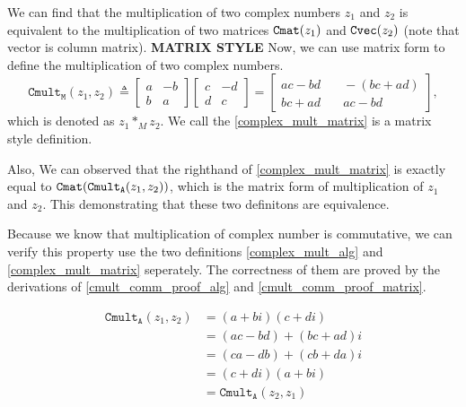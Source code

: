 \documentclass[runningheads,a4paper,english]{llncs}[2022/01/12]
\newcommand{\bmatL}{\begin{bmatrix}}
\newcommand{\bmatR}{\end{bmatrix}}
\begin{document}

We can find that the multiplication of two complex numbers $z_1$ and $z_2$ is equivalent to the multiplication of two matrices $\Cmat{z_1}$ and $\Cvec{z_2}$ (note that vector is column matrix).
\textbf{MATRIX STYLE}
Now, we can use matrix form to define the multiplication of two complex numbers.
\begin{equation}\label{complex_mult_matrix}
  \mathtt{Cmult_M}(z_1,z_2)\triangleq\bmatL a&-b\\b&a\bmatR \bmatL c&-d\\d&c\bmatR 
  =\bmatL ac-bd&\quad -(bc+ad)\\bc+ad&\quad ac-bd\bmatR ,
\end{equation}
which is denoted as $z_1 *_M z_2$.
We call the \eqref{complex_mult_matrix} is a matrix style definition.

Also, We can observed that the righthand of \eqref{complex_mult_matrix} is exactly equal to $\Cmat{\mathtt{Cmult_A}(z_1,z_2)}$, which is the matrix form of multiplication of $z_1$ and $z_2$.
This demonstrating that these two definitons are equivalence.

Because we know that multiplication of complex number is commutative, we can verify this property use the two definitions \eqref{complex_mult_alg} and \eqref{complex_mult_matrix} seperately.
The correctness of them are proved by the derivations of \eqref{cmult_comm_proof_alg} and \eqref{cmult_comm_proof_matrix}.

\begin{equation}\label{cmult_comm_proof_alg}
  \begin{aligned}
    \mathtt{Cmult_A}(z_1,z_2)
    &=(a+bi)(c+di)\\
    &=(ac-bd)+(bc+ad)i\\
    &=(ca-db)+(cb+da)i\\
    &=(c+di)(a+bi)\\
    &=\mathtt{Cmult_A}(z_2,z_1)
  \end{aligned}
\end{equation}
\end{document}
